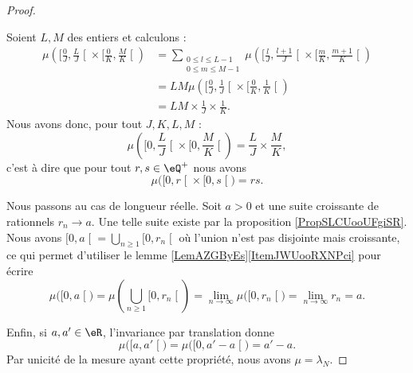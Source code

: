 \begin{proof}
\begin{subproof}
        Soient \( L,M\) des entiers et calculons :
        \begin{subequations}
            \begin{align}
                \mu\left( \mathopen[ \frac{ 0 }{ J } , \frac{ L }{ J } \mathclose[\times \mathopen[ \frac{ 0 }{ K } , \frac{ M }{ K } \mathclose[ \right)&=\sum_{\substack{0\leq l\leq L-1\\0\leq m\leq M-1}}\mu\left(   \mathopen[    \frac{ l }{ J },\frac{ l+1 }{ J }  \mathclose[\times \mathopen[ \frac{ m }{ K } , \frac{ m+1 }{ K } \mathclose[      \right)\\
                    &=LM\mu\left(  \mathopen[ \frac{ 0 }{ J } , \frac{ 1 }{ J } \mathclose[\times \mathopen[ \frac{ 0 }{ K } , \frac{ 1 }{ K } \mathclose[  \right)\\
                        &=LM\times \frac{1}{ J }\times \frac{1}{ K }.
            \end{align}
        \end{subequations}
        Nous avons donc, pour tout \( J,K,L,M\) : 
        \begin{equation}
            \mu\left( \mathopen[ 0 , \frac{ L }{ J } \mathclose[\times \mathopen[ 0, \frac{ M }{ K } \mathclose[ \right)=\frac{ L }{ J }\times \frac{ M }{ K },
        \end{equation}
        c'est à dire que pour tout \( r,s\in \eQ^+\) nous avons
        \begin{equation}
            \mu\big(   \mathopen[ 0 , r \mathclose[\times \mathopen[ 0 , s \mathclose[ \big)=rs.
        \end{equation}
    \item[Longueur réelle]
        Nous passons au cas de longueur réelle. Soit \( a>0\) et une suite croissante de rationnels \( r_n\to a\). Une telle suite existe par la proposition \ref{PropSLCUooUFgiSR}. Nous avons \( \mathopen[ 0 , a \mathclose[=\bigcup_{n\geq 1}\mathopen[ 0 , r_n \mathclose[\) où l'union n'est pas disjointe mais croissante, ce qui permet d'utiliser le lemme \ref{LemAZGByEs}\ref{ItemJWUooRXNPci} pour écrire
        \begin{equation}
            \mu\big( \mathopen[ 0 , a \mathclose[ \big)=\mu\left( \bigcup_{n\geq 1}\mathopen[ 0 , r_n \mathclose[ \right)=\lim_{n\to \infty} \mu\big( \mathopen[ 0 , r_n \mathclose[ \big)=\lim_{n\to \infty} r_n=a.
        \end{equation}
    \end{subproof}

    Enfin, si \( a,a'\in \eR\), l'invariance par translation donne
    \begin{equation}
        \mu\big( \mathopen[ a , a' \mathclose[ \big)=\mu\big( \mathopen[ 0 , a'-a \mathclose[ \big)=a'-a.
    \end{equation}
    Par unicité de la mesure ayant cette propriété, nous avons \( \mu=\lambda_N\).
\end{proof}

